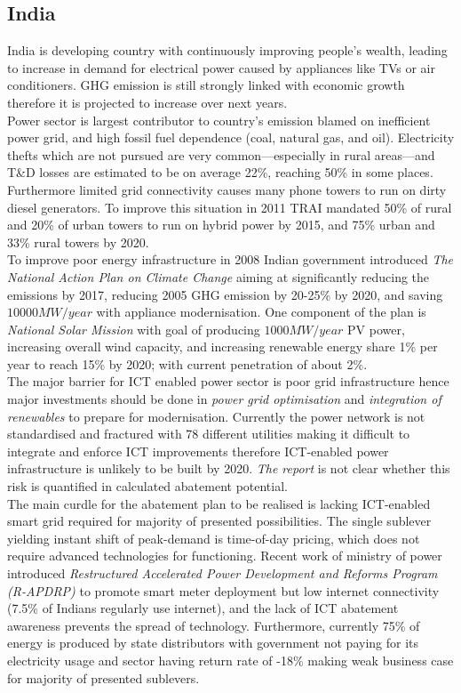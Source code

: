\documentclass[11pt, twocolumn]{article}
\begin{document}
\subsection{India}
India is developing country with continuously improving people's wealth, leading to increase in demand for electrical power caused by appliances like TVs or air conditioners. GHG emission is still strongly linked with economic growth therefore it is projected to increase over next years.\\
Power sector is largest contributor to country's emission blamed on inefficient power grid, and high fossil fuel dependence (coal, natural gas, and oil). Electricity thefts which are not pursued are very common---especially in rural areas---and T\&D losses are estimated to be on average 22\%, reaching 50\% in some places. Furthermore limited grid connectivity causes many phone towers to run on dirty diesel generators. To improve this situation in 2011 TRAI mandated 50\% of rural and 20\% of urban towers to run on hybrid power by 2015, and 75\% urban and 33\% rural towers by 2020.\\
To improve poor energy infrastructure in 2008 Indian government introduced \emph{The National Action Plan on Climate Change} aiming at significantly reducing the emissions by 2017, reducing 2005 GHG emission by 20-25\% by 2020, and saving $10000 MW/year$ with appliance modernisation. One component of the plan is \emph{National Solar Mission} with goal of producing $1000 MW/year$ PV power, increasing overall wind capacity, and increasing renewable energy share 1\% per year to reach 15\% by 2020; with current penetration of about 2\%.\\
The major barrier for ICT enabled power sector is poor grid infrastructure hence major investments should be done in \emph{power grid optimisation} and \emph{integration of renewables} to prepare for modernisation. Currently the power network is not standardised and fractured with 78 different utilities making it difficult to integrate and enforce ICT improvements therefore ICT-enabled power infrastructure is unlikely to be built by 2020. \emph{The report} is not clear whether this risk is quantified in calculated abatement potential.\\
The main curdle for the abatement plan to be realised is lacking ICT-enabled smart grid required for majority of presented possibilities. The single sublever yielding instant shift of peak-demand is time-of-day pricing, which does not require advanced technologies for functioning. Recent work of ministry of power introduced \emph{Restructured Accelerated Power Development and Reforms Program (R-APDRP)} to promote smart meter deployment but low internet connectivity (7.5\% of Indians regularly use internet), and the lack of ICT abatement awareness prevents the spread of technology. Furthermore, currently 75\% of energy is produced by state distributors with government not paying for its electricity usage and sector having return rate of -18\% making weak business case for majority of presented sublevers.\\
\end{document}
